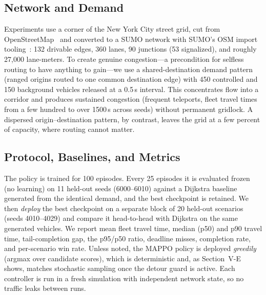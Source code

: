 \subsection{Network and Demand}
Experiments use a corner of the New York City street grid, cut from
OpenStreetMap~\cite{osm} and converted to a SUMO network with SUMO's OSM import
tooling~\cite{lopez2018sumo}: 132 drivable edges, 360 lanes, 90 junctions (53
signalized), and roughly 27{,}000 lane-meters. To create genuine
congestion---a precondition for selfless routing to have anything to gain---we use a
shared-destination demand pattern (ranged origins routed to one common destination edge)
with 450 controlled and 150 background vehicles released at a 0.5\,s interval. This
concentrates flow into a corridor and produces sustained congestion (frequent teleports,
fleet travel times from a few hundred to over 1500\,s across seeds) without permanent
gridlock. A dispersed origin--destination pattern, by contrast, leaves the grid at a few
percent of capacity, where routing cannot matter.

\subsection{Protocol, Baselines, and Metrics}
The policy is trained for 100 episodes. Every 25 episodes it is evaluated frozen (no
learning) on 11 held-out seeds (6000--6010) against a Dijkstra baseline generated from the
identical demand, and the best checkpoint is retained. We then \emph{deploy} the best
checkpoint on a separate block of 20 held-out scenarios (seeds 4010--4029) and compare it
head-to-head with Dijkstra on the same generated vehicles. We report mean fleet travel
time, median (p50) and p90 travel time, tail-completion gap, the p95/p50 ratio, deadline
misses, completion rate, and per-scenario win rate. Unless noted, the MAPPO policy is
deployed \emph{greedily} (argmax over candidate scores), which is deterministic and, as
Section~V-E shows, matches stochastic sampling once the detour guard is active. Each
controller is run in a fresh simulation with independent network state, so no traffic
leaks between runs.
